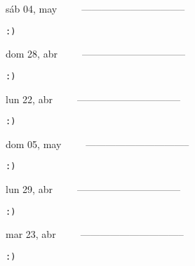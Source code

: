 \documentclass[letterpaper,10pt]{article}
\begin{document}
\begin{multicols}{3}
{sáb 04, may\ \ \ \ \ --------------------------------}
\begin{flushright}\begin{small}\texttt{:)}\end{small}\end{flushright}
\vfill
{dom 28, abr\ \ \ \ \ --------------------------------}
\begin{flushright}\begin{small}\texttt{:)}\end{small}\end{flushright}\par
\vfill
{lun 22, abr\ \ \ \ \ --------------------------------}
\begin{flushright}\begin{small}\texttt{:)}\end{small}\end{flushright}\par
\vfill
\end{multicols}
\vspace{1.05cm}

\begin{multicols}{3}
{dom 05, may\ \ \ \ \ --------------------------------}
\begin{flushright}\begin{small}\texttt{:)}\end{small}\end{flushright}
\vfill
{lun 29, abr\ \ \ \ \ --------------------------------}
\begin{flushright}\begin{small}\texttt{:)}\end{small}\end{flushright}\par
\vfill
{mar 23, abr\ \ \ \ \ --------------------------------}
\begin{flushright}\begin{small}\texttt{:)}\end{small}\end{flushright}\par
\vfill
\end{multicols}
\vspace{1.05cm}
\end{document}
